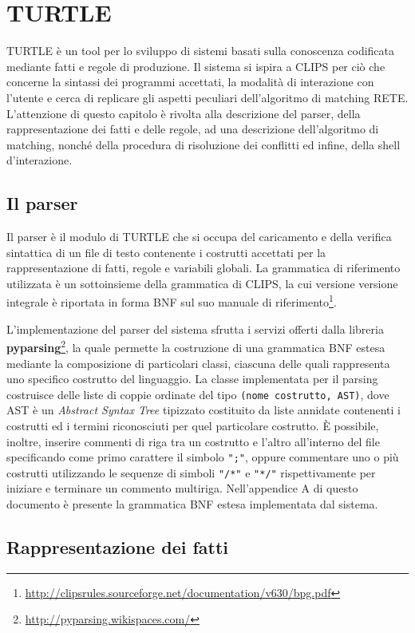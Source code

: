 \chapter{TURTLE}
TURTLE è un tool per lo sviluppo di sistemi basati sulla conoscenza codificata mediante fatti e regole di produzione. Il sistema si ispira a CLIPS per ciò che concerne la sintassi dei programmi accettati, la modalità di interazione con l'utente e cerca di replicare gli aspetti peculiari dell'algoritmo di matching RETE. L'attenzione di questo capitolo è rivolta alla descrizione del parser, della rappresentazione dei fatti e delle regole, ad una descrizione dell'algoritmo di matching, nonché della procedura di risoluzione dei conflitti ed infine, della shell d'interazione.

\section{Il parser}
Il parser è il modulo di TURTLE che si occupa del caricamento e della verifica sintattica di un file di testo contenente i costrutti accettati per la rappresentazione di fatti, regole e variabili globali. La grammatica di riferimento utilizzata è un sottoinsieme della grammatica di CLIPS, la cui versione versione integrale è riportata in forma BNF sul suo manuale di riferimento\footnote{\url{http://clipsrules.sourceforge.net/documentation/v630/bpg.pdf}}.

L'implementazione del parser del sistema sfrutta i servizi offerti dalla libreria \textbf{pyparsing}\footnote{\url{http://pyparsing.wikispaces.com/}}, la quale permette la costruzione di una grammatica BNF estesa mediante la composizione di particolari classi, ciascuna delle quali rappresenta uno specifico costrutto del linguaggio. La classe implementata per il parsing costruisce delle liste di coppie ordinate del tipo \verb!(nome costrutto, AST)!, dove AST è un \emph{Abstract Syntax Tree} tipizzato costituito da liste annidate contenenti i costrutti ed i termini riconosciuti per quel particolare costrutto. È possibile, inoltre, inserire commenti di riga tra un costrutto e l'altro all'interno del file specificando come primo carattere il simbolo \verb!";"!, oppure commentare uno o più costrutti utilizzando le sequenze di simboli \verb!"/*"! e \verb!"*/"! rispettivamente per iniziare e terminare un commento multiriga. Nell'appendice A di questo documento è presente la grammatica BNF estesa implementata dal sistema.

\section{Rappresentazione dei fatti}

